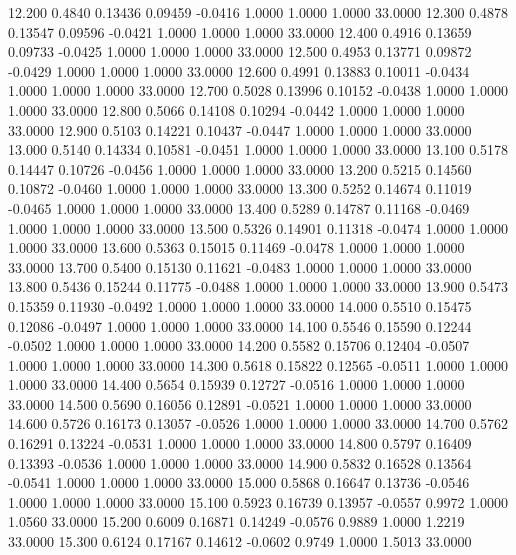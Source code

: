   12.200   0.4840   0.13436   0.09459  -0.0416   1.0000   1.0000   1.0000  33.0000
  12.300   0.4878   0.13547   0.09596  -0.0421   1.0000   1.0000   1.0000  33.0000
  12.400   0.4916   0.13659   0.09733  -0.0425   1.0000   1.0000   1.0000  33.0000
  12.500   0.4953   0.13771   0.09872  -0.0429   1.0000   1.0000   1.0000  33.0000
  12.600   0.4991   0.13883   0.10011  -0.0434   1.0000   1.0000   1.0000  33.0000
  12.700   0.5028   0.13996   0.10152  -0.0438   1.0000   1.0000   1.0000  33.0000
  12.800   0.5066   0.14108   0.10294  -0.0442   1.0000   1.0000   1.0000  33.0000
  12.900   0.5103   0.14221   0.10437  -0.0447   1.0000   1.0000   1.0000  33.0000
  13.000   0.5140   0.14334   0.10581  -0.0451   1.0000   1.0000   1.0000  33.0000
  13.100   0.5178   0.14447   0.10726  -0.0456   1.0000   1.0000   1.0000  33.0000
  13.200   0.5215   0.14560   0.10872  -0.0460   1.0000   1.0000   1.0000  33.0000
  13.300   0.5252   0.14674   0.11019  -0.0465   1.0000   1.0000   1.0000  33.0000
  13.400   0.5289   0.14787   0.11168  -0.0469   1.0000   1.0000   1.0000  33.0000
  13.500   0.5326   0.14901   0.11318  -0.0474   1.0000   1.0000   1.0000  33.0000
  13.600   0.5363   0.15015   0.11469  -0.0478   1.0000   1.0000   1.0000  33.0000
  13.700   0.5400   0.15130   0.11621  -0.0483   1.0000   1.0000   1.0000  33.0000
  13.800   0.5436   0.15244   0.11775  -0.0488   1.0000   1.0000   1.0000  33.0000
  13.900   0.5473   0.15359   0.11930  -0.0492   1.0000   1.0000   1.0000  33.0000
  14.000   0.5510   0.15475   0.12086  -0.0497   1.0000   1.0000   1.0000  33.0000
  14.100   0.5546   0.15590   0.12244  -0.0502   1.0000   1.0000   1.0000  33.0000
  14.200   0.5582   0.15706   0.12404  -0.0507   1.0000   1.0000   1.0000  33.0000
  14.300   0.5618   0.15822   0.12565  -0.0511   1.0000   1.0000   1.0000  33.0000
  14.400   0.5654   0.15939   0.12727  -0.0516   1.0000   1.0000   1.0000  33.0000
  14.500   0.5690   0.16056   0.12891  -0.0521   1.0000   1.0000   1.0000  33.0000
  14.600   0.5726   0.16173   0.13057  -0.0526   1.0000   1.0000   1.0000  33.0000
  14.700   0.5762   0.16291   0.13224  -0.0531   1.0000   1.0000   1.0000  33.0000
  14.800   0.5797   0.16409   0.13393  -0.0536   1.0000   1.0000   1.0000  33.0000
  14.900   0.5832   0.16528   0.13564  -0.0541   1.0000   1.0000   1.0000  33.0000
  15.000   0.5868   0.16647   0.13736  -0.0546   1.0000   1.0000   1.0000  33.0000
  15.100   0.5923   0.16739   0.13957  -0.0557   0.9972   1.0000   1.0560  33.0000
  15.200   0.6009   0.16871   0.14249  -0.0576   0.9889   1.0000   1.2219  33.0000
  15.300   0.6124   0.17167   0.14612  -0.0602   0.9749   1.0000   1.5013  33.0000
